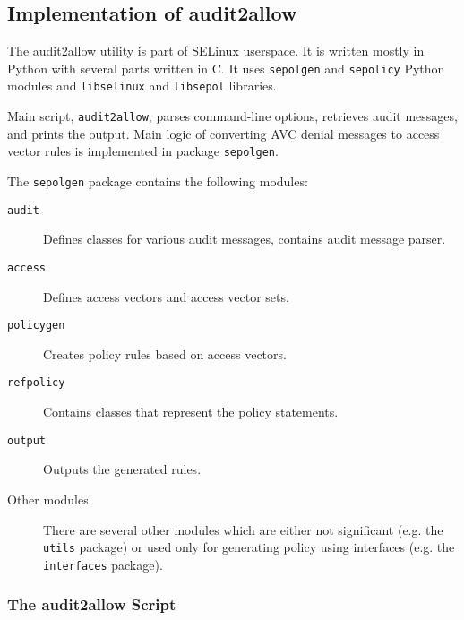 \subsection{Implementation of audit2allow}
The audit2allow utility is part of SELinux userspace. It is written mostly in
Python with several parts written in C. It uses \texttt{sepolgen} and
\texttt{sepolicy} Python modules and \texttt{libselinux} and \texttt{libsepol}
libraries.

Main script, \texttt{audit2allow}, parses command-line options, retrieves audit
messages, and prints the output.  Main logic of converting AVC denial messages
to access vector rules is implemented in package \texttt{sepolgen}.

The \texttt{sepolgen} package contains the following modules:
\begin{description}
    \item [\texttt{audit}] Defines classes for various audit messages, contains
        audit message parser.
    \item [\texttt{access}] Defines access vectors and access vector sets.
    \item [\texttt{policygen}] Creates policy rules based on access vectors.
    \item [\texttt{refpolicy}] Contains classes that represent the policy
        statements.
    \item [\texttt{output}] Outputs the generated rules.
    \item [Other modules] There are several other modules which are either not
        significant (e.g. the \texttt{utils} package) or used only for
        generating policy using interfaces (e.g. the \texttt{interfaces}
        package).
\end{description}

\subsubsection{The audit2allow Script}

